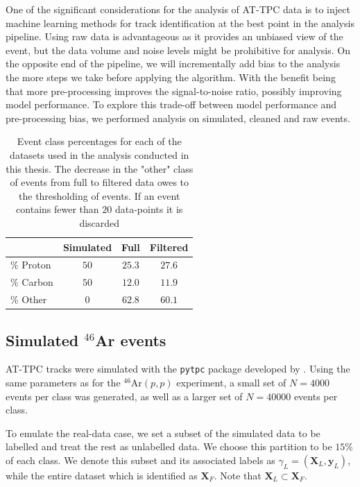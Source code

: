 \documentclass[review,number,sort&compress]{elsarticle}
\begin{document}
One of the significant considerations for the analysis of AT-TPC data is to inject machine learning methods for track identification at the best point in the analysis pipeline.
Using raw data is advantageous as it provides an unbiased view of the event, but the data volume and noise levels might be prohibitive for analysis.
On the opposite end of the pipeline, we will incrementally add bias to the analysis the more steps we take before applying the algorithm. With the benefit being that more pre-processing improves the signal-to-noise ratio, possibly improving model performance.
To explore this trade-off between model performance and pre-processing bias, we performed analysis on simulated, cleaned and raw events.

\begin{table}
\centering
\caption{Event class percentages for each of the datasets used in the analysis conducted in this thesis. The decrease in the "other" class of events from full to filtered data owes to the thresholding of events. If an event contains fewer than $20$ data-points it is discarded }\label{tab:class_distr}
\begin{tabular}{lccc}
\toprule
{} & Simulated & Full & Filtered \\
\midrule
$\%$ Proton & $50$ & $25.3$ & $27.6$ \\ 
$\%$ Carbon & $50$ & $12.0$ & $11.9$ \\
$\%$ Other & $0$ & $62.8$ & $60.1$ \\
\end{tabular}
\end{table}

\subsection{Simulated \texorpdfstring{${}^{46}$Ar}{46Ar}  events}\label{sec:data_sim}

AT-TPC tracks were simulated with the \lstinline{pytpc} package developed by \citet{Bradt2017a}. Using the same parameters as for the ${}^{46}$Ar$(p, p)$ experiment, a small set of $N=4000$ events per class was generated, as well as a larger set of $N=40000$ events per class. 

To emulate the real-data case, we set a subset of the simulated data to be labelled and treat the rest as unlabelled data. We choose this partition to be $15\%$ of each class. We denote this subset and its associated labels as $\gamma_L=(\boldsymbol{X}_L, \boldsymbol{y}_L)$, while the entire dataset which is identified as $\boldsymbol{X}_F$. Note that $\boldsymbol{X}_L \subset \boldsymbol{X}_F$.
\end{document}

